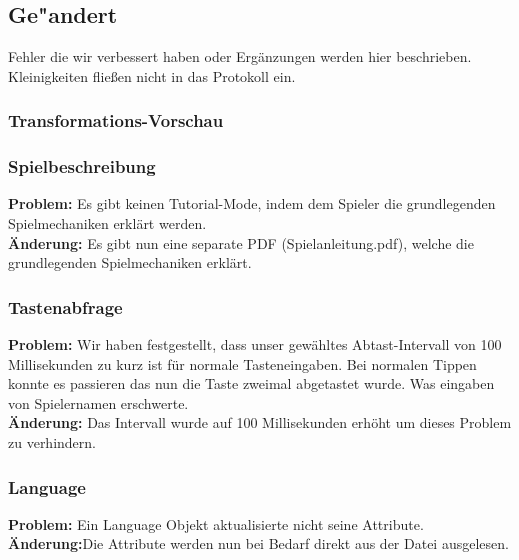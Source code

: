 %



\subsection{Ge{"a}ndert}
\label{Abschnitt:Aenderungen:Protokoll:Behobene_Probleme}

Fehler die wir verbessert haben oder Ergänzungen werden hier beschrieben. Kleinigkeiten fließen nicht in das Protokoll ein.\\











\subsubsection*{Transformations-Vorschau}








\subsubsection*{Spielbeschreibung}
\textbf{Problem:}
Es gibt keinen Tutorial-Mode, indem dem Spieler die grundlegenden Spielmechaniken erklärt werden. \\
\textbf{Änderung:} Es gibt nun eine separate PDF (\glqq Spielanleitung.pdf\grqq), welche die grundlegenden Spielmechaniken erklärt.

\subsubsection*{Tastenabfrage}
\textbf{Problem:}
Wir haben festgestellt, dass unser gewähltes Abtast-Intervall von 100 Millisekunden zu kurz ist für normale Tasteneingaben. Bei normalen Tippen konnte es passieren das nun die Taste zweimal abgetastet wurde. Was eingaben von Spielernamen erschwerte. \\
\textbf{Änderung:} Das Intervall wurde auf 100 Millisekunden erhöht um dieses Problem zu verhindern.

\subsubsection*{Language}
\textbf{Problem:}
Ein Language Objekt aktualisierte nicht seine Attribute.
\\
\textbf{Änderung:}Die Attribute werden nun bei Bedarf direkt aus der Datei ausgelesen.


